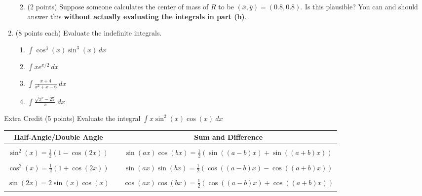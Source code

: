 \documentclass[12pt]{article}
\let\ds\displaystyle
\begin{document}
\begin{enumerate}
\begin{enumerate}
	\vfill
	
	\item (2 points) Suppose someone calculates the center of mass of $R$ to be $(\bar{x}, \bar{y}) = (0.8,0.8).$ Is this plausible?  You can and should answer this \textbf{without actually evaluating the integrals in part (b)}.
	
	\vfill
	\end{enumerate}
	
	 \newpage
 
 
 \item (8 points each) Evaluate the indefinite integrals.
 	\begin{enumerate}
	\item  $\ds \int \cos^3(x)\sin^3\left(x\right) \, dx$
	\vfill
	\item  $\displaystyle \int x e^{x/2} \: dx$
	\vfill
	\newpage
 	\item $\ds \int \frac{x+4}{x^2+x-6} \: dx$
	\vfill
	
	\item $\ds \int \frac{\sqrt{x^2-25}}{x } \: dx$
	\vfill
	\end{enumerate} 
\end{enumerate}
\newpage
Extra Credit (5 points) Evaluate the integral $\ds \int x \sin^2 (x) \cos(x) \: dx$\\
\vfill

\hrulefill

\begin{tabular}{ccc}
Half-Angle/Double Angle && Sum and Difference\\
\hline
&&\\
$\sin^2(x)=\frac{1}{2} ( 1-\cos(2x))$&&$\sin(ax)\cos(bx)=\frac{1}{2} ( \sin((a-b)x)+\sin((a+b)x))$\\ &&\\

 $\cos^2(x)=\frac{1}{2} ( 1+\cos(2x))$&&$\sin(ax)\sin(bx)=\frac{1}{2} ( \cos((a-b)x)-\cos((a+b)x))$\\ &&\\
 
$\sin(2x)=2\sin(x)\cos(x)$ &&$\cos(ax)\cos(bx)=\frac{1}{2} ( \cos((a-b)x)+\cos((a+b)x))$\\ &&\\
\end{tabular}
\vspace{0.5in}
\end{document}

